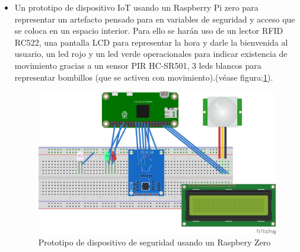 \begin{itemize}
\item Un prototipo de dispositivo IoT usando un Raspberry Pi zero para representar un artefacto pensado para en variables de seguridad y acceso que se coloca en un espacio interior. Para ello se harán uso de un lector RFID RC522, una pantalla LCD para representar la hora y darle la bienvenida al usuario, un led rojo y un led verde operacionales para indicar existencia de movimiento gracias a un sensor PIR HC-SR501, 3 leds blancos para representar bombillos (que se activen con movimiento).(véase figura:\ref{fig:rpizero_diagram}).
\begin{figure}[htb]
\centering
\includegraphics[scale=0.5]{./Figuras/rpizero_diagram.png}
\caption{Prototipo de dispositivo de seguridad usando un Raspbery Zero}
\label{fig:rpizero_diagram}
\vspace*{-10pt}
\end{figure}


\end{itemize}
